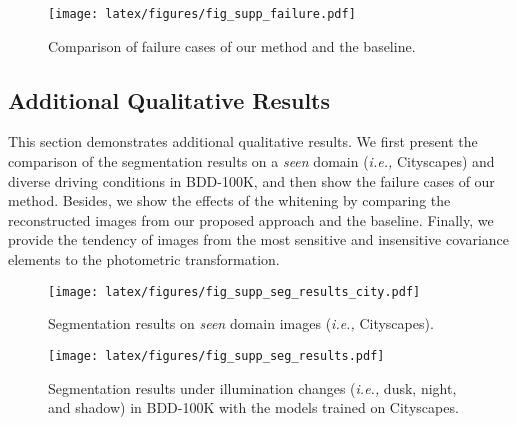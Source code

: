 \documentclass[final]{latex/cvpr}
\begin{document}
\begin{figure*}[!b]
\vspace*{-0.2cm}
\centering
  \texttt{[image: latex/figures/fig\_supp\_failure.pdf]}
\caption{Comparison of failure cases of our method and the baseline.}
\label{fig:supp_failure_results}
\end{figure*}

\subsection{Additional Qualitative Results}
\vspace*{-0.1cm}
This section demonstrates additional qualitative results. We first present the comparison of the segmentation results on a \emph{seen} domain (\textit{i.e.,} Cityscapes) and diverse driving conditions in BDD-100K, and then show the failure cases of our method. Besides, we show the effects of the whitening by comparing the reconstructed images from our proposed approach and the baseline. Finally, we provide the tendency of images from the most sensitive and insensitive covariance elements to the photometric transformation.

\begin{figure*}[!t]
\centering
  \texttt{[image: latex/figures/fig\_supp\_seg\_results\_city.pdf]}
\caption{Segmentation results on \emph{seen} domain images (\textit{i.e.,} Cityscapes).}
\label{fig:supp_seg_result_city}
\end{figure*}

\begin{figure*}[!b]
\vspace*{-0.2cm}
\centering
  \texttt{[image: latex/figures/fig\_supp\_seg\_results.pdf]}
  \caption{Segmentation results under illumination changes (\textit{i.e.,} dusk, night, and shadow) in BDD-100K with the models trained on Cityscapes.}
\label{fig:supp_seg_result_illumination}
\end{figure*}
\end{document}

